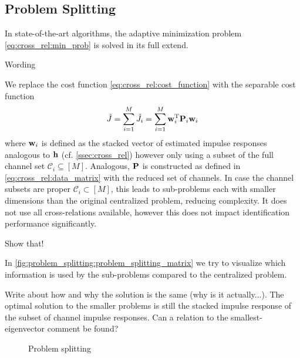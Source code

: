 \documentclass{article}
\newcommand{\h}{\mtxb{h}}
\newcommand{\w}{\mtxb{w}}
\newcommand{\aRho}{\mtxb{P}}
\begin{document}
\subsection{Problem Splitting}
\label{ssec:problem_splitting}
In state-of-the-art algorithms, the adaptive minimization problem \eqref{eq:cross_rel:min_prob} is solved in its full extend.
\begin{note}
    Wording
\end{note}
We replace the cost function \eqref{eq:cross_rel:cost_function} with the separable cost function 
\begin{equation}
    \tilde{J} = \sum_{i=1}^M \tilde{J}_i  = \sum_{i=1}^M \w_i^\T \aRho_i \w_i
\end{equation}
where \(\w_i\) is defined as the stacked vector of estimated impulse responses analogous to \(\h\) (cf. \autoref{ssec:cross_rel}) however only using a subset of the full channel set \(\mathcal{C}_i \subseteq [M]\).
Analogous, \(\aRho\) is constructed as defined in \eqref{eq:cross_rel:data_matrix} with the reduced set of channels.
In case the channel subsets are proper \(\mathcal{C}_i \subset [M]\), this leads to sub-problems each with smaller dimensions than the original centralized problem, reducing complexity.
It does not use all cross-relations available, however this does not impact identification performance significantly. 
\begin{attention}
    Show that!
\end{attention}
In \autoref{fig:problem_splitting:problem_splitting_matrix} we try to visualize which information is used by the sub-problems compared to the centralized problem.
\begin{attention}
    Write about how and why the solution is the same (why is it actually...). The optimal solution to the smaller problems is still the stacked impulse response of the subset of channel impulse responses. Can a relation to the smallest-eigenvector comment be found?
\end{attention}


\begin{figure}
    \centering
    
    \caption{Problem splitting}
    \label{fig:problem_splitting:problem_splitting_matrix}
\end{figure}

\end{document}
